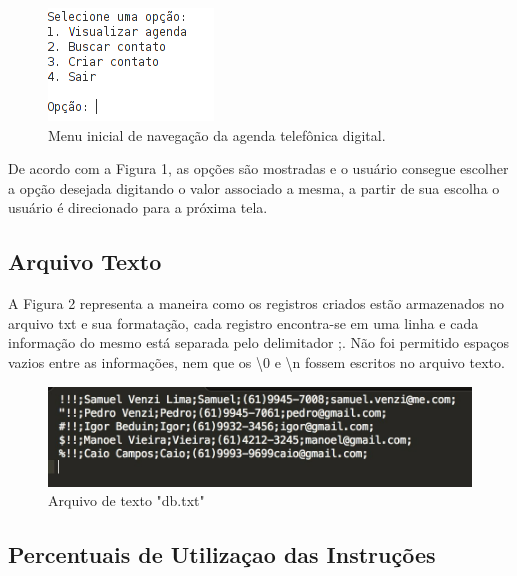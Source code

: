\documentclass[10pt,twocolumn,letterpaper]{article}
\begin{document}
\begin{figure}[ht]
\renewcommand{\figurename}{Figura}
\begin{center}
   \includegraphics[width=0.5\linewidth]{1}
\end{center}
   \caption{Menu inicial de navegação da agenda telefônica digital.}
\label{fig:long}
\label{fig:onecol}
\end{figure}

De acordo com a Figura 1, as opções são mostradas e o usuário consegue escolher a opção desejada digitando o valor associado a mesma, a partir de sua escolha o usuário é direcionado para a próxima tela.

\subsection{Arquivo Texto}

A Figura 2 representa a maneira como os registros criados estão armazenados no arquivo txt e sua formatação, cada registro encontra-se em uma linha e cada informação do mesmo está separada pelo delimitador ;. Não foi permitido espaços vazios entre as informações, nem que os \textbackslash0 e \textbackslash n fossem escritos no arquivo texto.

\begin{figure}[ht]
\renewcommand{\figurename}{Figura}
\begin{center}
   \includegraphics[width=1.0\linewidth]{2}
\end{center}
   \caption{Arquivo de texto "db.txt"}
\label{fig:long}
\label{fig:onecol}
\end{figure}

\subsection{Percentuais de Utilizaçao das Instruções}
\end{document}
